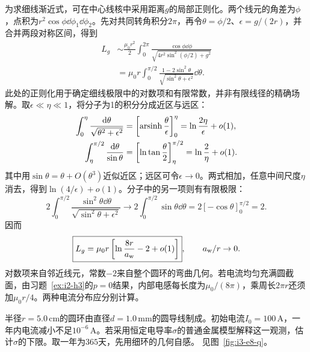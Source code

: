 为求细线渐近式，可在中心线核中采用距离$g$的局部正则化。两个线元的角差为$\phi$，点积为$r^2\cos\phi\dd\phi_1\dd\phi_2$。先对共同转角积分$2\pi$，再令$\theta=\phi/2$、$\epsilon=g/(2r)$，并合并两段对称区间，得到
\[\begin{aligned}
L_g&\sim\frac{\mu_0r^2}{2}\int_0^{2\pi}
\frac{\cos\phi\dd\phi}{\sqrt{4r^2\sin^2(\phi/2)+g^2}}\\
&=\mu_0r\int_0^{\pi/2}
\frac{1-2\sin^2\theta}{\sqrt{\sin^2\theta+\epsilon^2}}\dd\theta.
\end{aligned}\]
此处的正则化用于确定细线极限中的对数项和有限常数，并非有限线径的精确场解。取$\epsilon\ll\eta\ll1$，将分子为1的积分分成近区与远区：
\[\begin{aligned}
\int_0^\eta\frac{\mathop{}\!\mathrm d\theta}{\sqrt{\theta^2+\epsilon^2}}
&=\left[\operatorname{arsinh}\frac\theta\epsilon\right]_0^\eta
=\ln\frac{2\eta}\epsilon+o(1),\\
\int_\eta^{\pi/2}\frac{\mathop{}\!\mathrm d\theta}{\sin\theta}
&=\left[\ln\tan\frac\theta2\right]_\eta^{\pi/2}
=\ln\frac2\eta+o(1).
\end{aligned}\]
其中用$\sin\theta=\theta+O(\theta^3)$近似近区；远区可令$\epsilon\to0$。两式相加，任意中间尺度$\eta$消去，得到$\ln(4/\epsilon)+o(1)$。分子中的另一项则有有限极限：
\[2\int_0^{\pi/2}\frac{\sin^2\theta\dd\theta}
{\sqrt{\sin^2\theta+\epsilon^2}}
\longrightarrow2\int_0^{\pi/2}\sin\theta\dd\theta
=2[-\cos\theta]_0^{\pi/2}=2.
\]
因而
\[\boxed{L_g=\mu_0r\left[\ln\frac{8r}{a_{\rm w}}-2+o(1)\right]},
\qquad a_{\rm w}/r\to0.
\]
对数项来自邻近线元，常数$-2$来自整个圆环的弯曲几何。若电流均匀充满圆截面，由习题~\ref{ex:i2-h3}的$p=0$结果，内部电感每长度为$\mu_0/(8\pi)$，乘周长$2\pi r$还须加$\mu_0r/4$。两种电流分布应分别计算。

\begin{example}[持续电流给出的电导率下限]\label{ex:i3-e8}

半径$r=5.0\,\mathrm{cm}$的圆环由直径$d=1.0\,\mathrm{mm}$的圆导线制成。初始电流$I_0=100\,\mathrm A$，一年内电流减小不足$10^{-6}\,\mathrm A$。若采用恒定电导率$\sigma$的普通金属模型解释这一观测，估计$\sigma$的下限。取一年为$365$天，先用细环的几何自感。
 见图~\ref{fig:i3-e8-q}。
\end{example}


